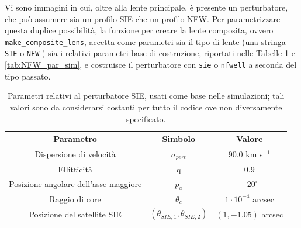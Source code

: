 Vi sono immagini in cui, oltre alla lente principale, è presente un perturbatore, che può assumere sia un profilo SIE che un profilo NFW.
Per parametrizzare questa duplice possibilità, la funzione per creare la lente composita, ovvero \texttt{make\_composite\_lens}, accetta come parametri sia il tipo di lente (una stringa \texttt{SIE} o \texttt{NFW}
) sia i relativi parametri base di costruzione, riportati nelle Tabelle \ref{tab:SIE_par_sim} e \ref{tab:NFW_par_sim}, e costruisce il perturbatore con \texttt{sie} o \texttt{nfwell} a seconda del tipo passato.
\begin{table}[]
\centering
\begin{tabular}{|c|c|c|}
\hline
\textbf{Parametro}                    & \textbf{Simbolo}                     & \textbf{Valore}          \\ \hline
Dispersione di velocità               & $\sigma_{pert}$                      & 90.0 km s$^{-1}$         \\ \hline
Ellitticità                           & q                                    & 0.9                      \\ \hline
Posizione angolare dell'asse maggiore & $p_a$                                & $-20^\circ$              \\ \hline
Raggio di core                        & $\theta_c$                           & $1 \cdot 10^{-4}$ arcsec \\ \hline
Posizione del satellite SIE           & $(\theta_{SIE, 1}, \theta_{SIE, 2})$ & $(1,-1.05)$ arcsec       \\ \hline
\end{tabular}
\caption{Parametri relativi al perturbatore SIE, usati come base nelle simulazioni; tali valori sono da considerarsi costanti per tutto il codice ove non diversamente specificato.}
\label{tab:SIE_par_sim}
\end{table}

